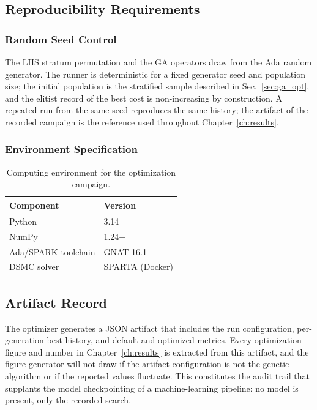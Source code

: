 \subsection{Reproducibility Requirements}

\subsubsection*{Random Seed Control}
The LHS stratum permutation and the GA operators draw from the Ada random generator. The runner is deterministic for a fixed generator seed and population size; the initial population is the stratified sample described in Sec.~\ref{sec:ga_opt}, and the elitist record of the best cost is non-increasing by construction. A repeated run from the same seed reproduces the same history; the artifact of the recorded campaign is the reference used throughout Chapter~\ref{ch:results}.

\subsubsection*{Environment Specification}
\begin{table}[H]
    \centering
    \caption{Computing environment for the optimization campaign.}
    \label{tab:env_spec}
    \begin{tabular}{|l|l|}
        \hline
        \textbf{Component} & \textbf{Version} \\ \hline
        Python & 3.14 \\ \hline
        NumPy & 1.24+ \\ \hline
        Ada/SPARK toolchain & GNAT 16.1 \\ \hline
        DSMC solver & SPARTA (Docker) \\ \hline
    \end{tabular}
\end{table}

\subsection{Artifact Record}
The optimizer generates a JSON artifact that includes the run configuration, per-generation best history, and default and optimized metrics. Every optimization figure and number in Chapter~\ref{ch:results} is extracted from this artifact, and the figure generator will not draw if the artifact configuration is not the genetic algorithm or if the reported values fluctuate. This constitutes the audit trail that supplants the model checkpointing of a machine-learning pipeline: no model is present, only the recorded search.

\clearpage

